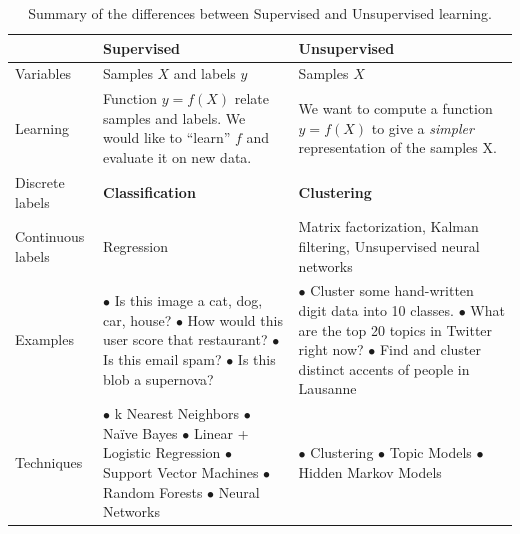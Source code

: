 \begin{table}[h!]
  \centering
  \begin{tabular}{m{2cm}||m{5.5cm}|m{5.5cm}}
    & Supervised & Unsupervised \\ \hline\hline
    Variables & Samples $X$ and labels $y$ & Samples $X$ \\ \hline
    Learning & Function $y = f(X)$ relate samples and labels. We would like to ``learn'' $f$ and evaluate it on new data. & We want to compute a function $y = f(X)$ to give a \emph{simpler} representation of the samples X. \\ \hline
    Discrete \newline labels & {\bf Classification} & {\bf Clustering} \\ \hline
    Continuous labels & Regression & Matrix factorization, Kalman filtering, Unsupervised neural networks \\ \hline 
    Examples & 
	      $\bullet$ Is this image a cat, dog, car, house? \newline
	      $\bullet$ How would this user score that restaurant? \newline
	      $\bullet$ Is this email spam? \newline
	      $\bullet$ Is this blob a supernova?
	     &
	      $\bullet$ Cluster some hand-written digit data into 10 classes. \newline
	      $\bullet$ What are the top 20 topics in Twitter right now? \newline
	      $\bullet$ Find and cluster distinct accents of people in Lausanne
            \\ \hline
    Techniques & 
	      $\bullet$ k Nearest Neighbors \newline
	      $\bullet$ Na\"ive Bayes \newline
	      $\bullet$ Linear + Logistic Regression \newline
	      $\bullet$ Support Vector Machines \newline
	      $\bullet$ Random Forests \newline
	      $\bullet$ Neural Networks
	    &
	      $\bullet$ Clustering \newline
	      $\bullet$ Topic Models \newline
	      $\bullet$ Hidden Markov Models
	    \\ \hline
  \end{tabular}
  \label{tab:sup-unsup}
  \caption{Summary of the differences between Supervised and Unsupervised learning.}
\end{table}

